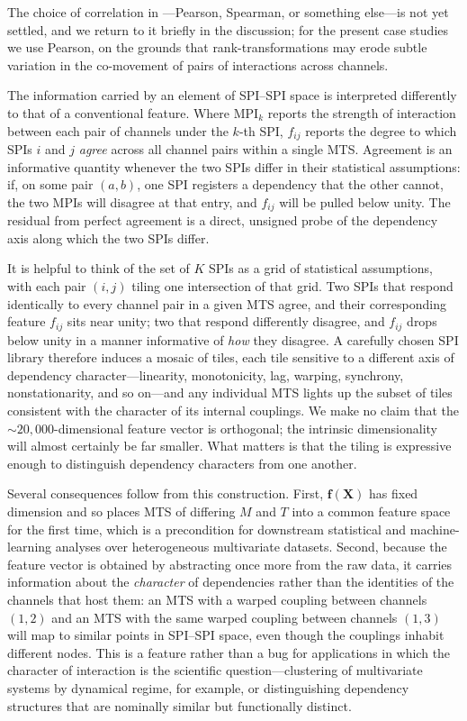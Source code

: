 \documentclass{article}
\theoremstyle{plain}
\theoremstyle{definition}
\theoremstyle{remark}
\begin{document}
The choice of correlation in ---Pearson, Spearman, or something else---is not yet settled, and we return to it briefly in the discussion; for the present case studies we use Pearson, on the grounds that rank-transformations may erode subtle variation in the co-movement of pairs of interactions across channels.

The information carried by an element of SPI--SPI space is interpreted differently to that of a conventional feature. Where $\mathrm{MPI}_k$ reports the strength of interaction between each pair of channels under the $k$-th SPI, $f_{ij}$ reports the degree to which SPIs $i$ and $j$ \emph{agree} across all channel pairs within a single MTS. Agreement is an informative quantity whenever the two SPIs differ in their statistical assumptions: if, on some pair $(a,b)$, one SPI registers a dependency that the other cannot, the two MPIs will disagree at that entry, and $f_{ij}$ will be pulled below unity. The residual from perfect agreement is a direct, unsigned probe of the dependency axis along which the two SPIs differ.

It is helpful to think of the set of $K$ SPIs as a grid of statistical assumptions, with each pair $(i,j)$ tiling one intersection of that grid. Two SPIs that respond identically to every channel pair in a given MTS agree, and their corresponding feature $f_{ij}$ sits near unity; two that respond differently disagree, and $f_{ij}$ drops below unity in a manner informative of \emph{how} they disagree. A carefully chosen SPI library therefore induces a mosaic of tiles, each tile sensitive to a different axis of dependency character---linearity, monotonicity, lag, warping, synchrony, nonstationarity, and so on---and any individual MTS lights up the subset of tiles consistent with the character of its internal couplings. We make no claim that the $\sim\!20{,}000$-dimensional feature vector is orthogonal; the intrinsic dimensionality will almost certainly be far smaller. What matters is that the tiling is expressive enough to distinguish dependency characters from one another.

Several consequences follow from this construction. First, $\mathbf{f}(\mathbf{X})$ has fixed dimension and so places MTS of differing $M$ and $T$ into a common feature space for the first time, which is a precondition for downstream statistical and machine-learning analyses over heterogeneous multivariate datasets. Second, because the feature vector is obtained by abstracting once more from the raw data, it carries information about the \emph{character} of dependencies rather than the identities of the channels that host them: an MTS with a warped coupling between channels $(1,2)$ and an MTS with the same warped coupling between channels $(1,3)$ will map to similar points in SPI--SPI space, even though the couplings inhabit different nodes. This is a feature rather than a bug for applications in which the character of interaction is the scientific question---clustering of multivariate systems by dynamical regime, for example, or distinguishing dependency structures that are nominally similar but functionally distinct.
\end{document}
